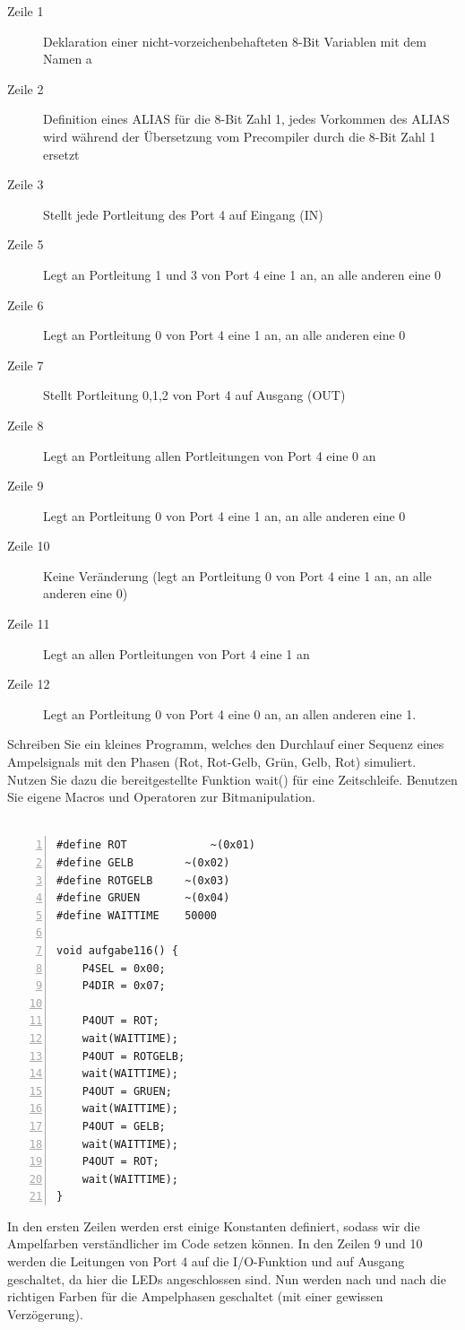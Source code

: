 \documentclass[11pt,a4paper,ngerman]{article}
\begin{document}
\begin{description}
		\begin{description}
		\item[Zeile 1] Deklaration einer nicht-vorzeichenbehafteten 8-Bit Variablen mit dem Namen a 
		\item[Zeile 2] Definition eines ALIAS für die 8-Bit Zahl 1, jedes Vorkommen des ALIAS wird  während der Übersetzung vom Precompiler durch die 8-Bit Zahl 1 ersetzt
		\item[Zeile 3] Stellt jede Portleitung des Port 4 auf Eingang (IN)
		\item[Zeile 5] Legt an Portleitung 1 und 3 von Port 4 eine 1 an, an alle anderen eine 0
		\item[Zeile 6] Legt an Portleitung 0 von Port 4 eine 1 an, an alle anderen eine 0
		\item[Zeile 7] Stellt Portleitung 0,1,2 von Port 4 auf Ausgang (OUT)
		\item[Zeile 8] Legt an Portleitung allen Portleitungen von Port 4 eine 0 an
		\item[Zeile 9] Legt an Portleitung 0 von Port 4 eine 1 an, an alle anderen eine 0
		\item[Zeile 10] Keine Veränderung (legt an Portleitung 0 von Port 4 eine 1 an, an alle anderen eine 0)
		\item[Zeile 11] Legt an allen Portleitungen von Port 4 eine 1 an
		\item[Zeile 12] Legt an Portleitung 0 von Port 4 eine 0 an, an allen anderen eine 1.
		\end{description}
		
		
	\item[A 1.1.6] Schreiben Sie ein kleines Programm, welches den Durchlauf einer Sequenz eines Ampelsignals mit den Phasen (Rot, Rot-Gelb, Grün, Gelb, Rot) simuliert. Nutzen Sie dazu die bereitgestellte Funktion wait() für eine Zeitschleife. Benutzen Sie eigene Macros und Operatoren zur Bitmanipulation.  \\ \\
	
		\begin{lstlisting}[numbers=left]
#define ROT 			~(0x01)
#define GELB  		~(0x02)
#define ROTGELB 	~(0x03)
#define GRUEN 		~(0x04)
#define WAITTIME	50000

void aufgabe116() {
	P4SEL = 0x00;
	P4DIR = 0x07;

	P4OUT = ROT;
	wait(WAITTIME);
	P4OUT = ROTGELB;
	wait(WAITTIME);
	P4OUT = GRUEN;
	wait(WAITTIME);
	P4OUT = GELB;
	wait(WAITTIME);
	P4OUT = ROT;
	wait(WAITTIME);
}
		\end{lstlisting}
		In den ersten Zeilen werden erst einige Konstanten definiert, sodass wir die Ampelfarben verständlicher im Code setzen können. In den Zeilen 9 und 10 werden die Leitungen von Port 4 auf die I/O-Funktion und auf Ausgang geschaltet, da hier die LEDs angeschlossen sind. Nun werden nach und nach die richtigen Farben für die Ampelphasen geschaltet (mit einer gewissen Verzögerung).
\end{description}
\end{document}
